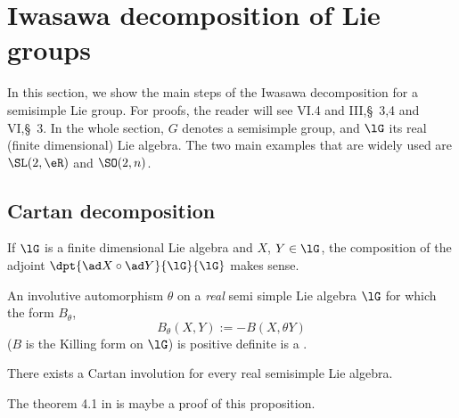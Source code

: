 
\section{Iwasawa decomposition of Lie groups}%

In this section, we show the main steps of the Iwasawa decomposition for a semisimple Lie group. For proofs, the reader will see \cite{Knapp} VI.4 and \cite{Helgason} III,\S\ 3,4 and VI,\S\ 3. In the whole section, $G$ denotes a semisimple group, and $\lG$ its real (finite dimensional) Lie algebra. The two main examples that are widely used are $\SL(2,\eR)$ and $\SO(2,n)$.

\subsection{Cartan decomposition}

If $\lG$ is a finite dimensional Lie algebra and $X$, $Y\in\lG$, the composition of the adjoint $\dpt{\ad X\circ \ad Y}{\lG}{\lG}$ makes sense.
\begin{definition}
	An involutive automorphism $\theta$ on a \emph{real} semi simple Lie algebra $\lG $ for which the form $B_{\theta}$,
	\begin{equation}
		B_{\theta}(X,Y):=-B(X,\theta Y)
	\end{equation}
	($B$ is the Killing form on $\lG$) is positive definite is a .
\end{definition}

\begin{proposition}
	There exists a Cartan involution for every real semisimple Lie algebra.
\end{proposition}

\begin{probleme}
	The theorem 4.1 in \cite{Helgason} is maybe a proof of this proposition.
\end{probleme}

